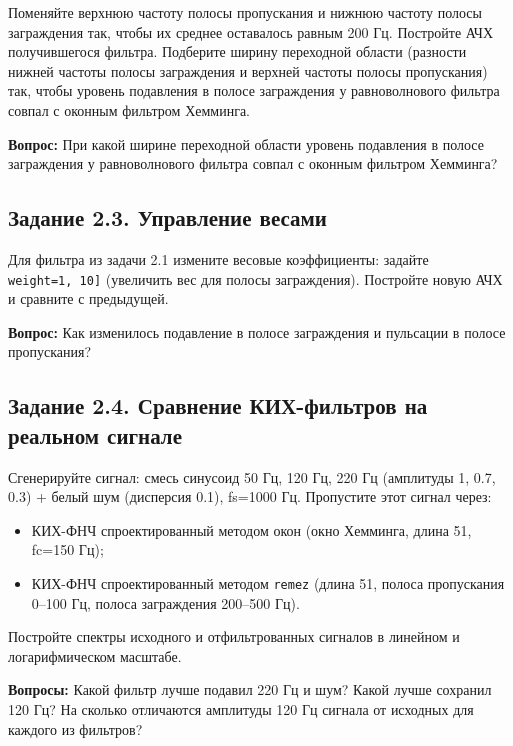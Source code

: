\documentclass[12pt,a4paper,openany]{book}
\providecommand{\tightlist}{\setlength{\itemsep}{0pt}\setlength{\parskip}{0pt}}
\begin{document}
Поменяйте верхнюю частоту полосы пропускания и нижнюю частоту полосы заграждения так, чтобы их среднее оставалось равным 200 Гц. Постройте АЧХ получившегося фильтра. Подберите ширину переходной области (разности нижней частоты полосы заграждения и верхней частоты полосы пропускания) так, чтобы уровень подавления в полосе заграждения у равноволнового фильтра совпал с оконным фильтром Хемминга.

\textbf{Вопрос:} При какой ширине переходной области уровень подавления в полосе заграждения у равноволнового фильтра совпал с оконным фильтром Хемминга?

\subsection*{Задание 2.3. Управление весами}

Для фильтра из задачи 2.1 измените весовые коэффициенты: задайте \texttt{weight=\allowbreak{}{[}1,\allowbreak{}\ 10{]}} (увеличить вес для полосы заграждения). Постройте новую АЧХ и сравните с предыдущей.

\textbf{Вопрос:} Как изменилось подавление в полосе заграждения и пульсации в полосе пропускания?

\subsection*{Задание 2.4. Сравнение КИХ-фильтров на реальном сигнале}

Сгенерируйте сигнал: смесь синусоид 50 Гц, 120 Гц, 220 Гц (амплитуды 1, 0.7, 0.3) + белый шум (дисперсия 0.1), fs=1000 Гц. Пропустите этот сигнал через:

\begin{itemize}
\tightlist
\item
  КИХ-ФНЧ спроектированный методом окон (окно Хемминга, длина 51, fc=150 Гц);
\item
  КИХ-ФНЧ спроектированный методом \texttt{remez} (длина 51, полоса пропускания 0--100 Гц, полоса заграждения 200--500 Гц).
\end{itemize}

Постройте спектры исходного и отфильтрованных сигналов в линейном и логарифмическом масштабе.

\textbf{Вопросы:} Какой фильтр лучше подавил 220 Гц и шум? Какой лучше сохранил 120 Гц? На сколько отличаются амплитуды 120 Гц сигнала от исходных для каждого из фильтров?
\end{document}
